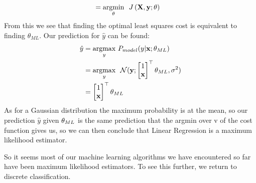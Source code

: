 \begin{example}
\begin{align*}
        &= \underset{\vtheta}{\argmin}\ \ J\left(\MX,\vy;\vtheta \right)
    \end{align*}
    From this we see that finding the optimal least squares cost is equivalent to finding $\theta_{ML}$. Our prediction for $\hat{y}$ can be found: 
    \begin{align*}
        \hat{y} &= \underset{y}{\argmax}\ P_{model}(y|\vx;\vtheta_{ML})\\
        &= \underset{y}{\argmax} \ \ \Normal(\vy;\begin{bmatrix} 1 \\ \vx \end{bmatrix}^\top\vtheta_{ML},\sigma^2) \\
        &= \begin{bmatrix} 1 \\ \vx \end{bmatrix}^\top\vtheta_{ML}
    \end{align*}
    As for a Gaussian distribution the maximum probability is at the mean, so our prediction $\hat{y}$ given $\vtheta_{ML}$ is the same prediction that the argmin over v of the cost function gives us, so we can then conclude that Linear Regression is a maximum likelihood estimator. 
\end{example}
So it seems most of our machine learning algorithms we have encountered so far have been maximum likelihood estimators. To see this further, we return to discrete classification. \\
